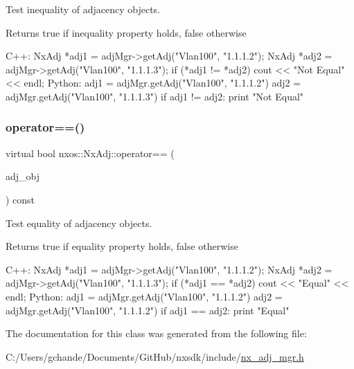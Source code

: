 Test inequality of adjacency objects.

\begin{DoxyReturn}{Returns}
true if inequality property holds, false otherwise
\end{DoxyReturn}

\begin{DoxyCode}
C++:
    NxAdj *adj1 = adjMgr->getAdj(\textcolor{stringliteral}{"Vlan100"}, \textcolor{stringliteral}{"1.1.1.2"});
    NxAdj *adj2 = adjMgr->getAdj(\textcolor{stringliteral}{"Vlan100"}, \textcolor{stringliteral}{"1.1.1.3"});
    \textcolor{keywordflow}{if} (*adj1 != *adj2)
        cout << \textcolor{stringliteral}{"Not Equal"} << endl;
Python:
    adj1 = adjMgr.getAdj(\textcolor{stringliteral}{"Vlan100"}, \textcolor{stringliteral}{"1.1.1.2"})
    adj2 = adjMgr.getAdj(\textcolor{stringliteral}{"Vlan100"}, \textcolor{stringliteral}{"1.1.1.3"})
    \textcolor{keywordflow}{if} adj1 != adj2:
         print \textcolor{stringliteral}{"Not Equal"}
\end{DoxyCode}
 \mbox{\label{classnxos_1_1_nx_adj_a19eea20ba216dd722d783bbb0982814e}} 
\subsubsection{\texorpdfstring{operator==()}{operator==()}}
{\footnotesize\ttfamily virtual bool nxos\+::\+Nx\+Adj\+::operator== (\begin{DoxyParamCaption}\item[{\mbox{\hyperlink{classnxos_1_1_nx_adj}{Nx\+Adj}} const \&}]{adj\+\_\+obj }\end{DoxyParamCaption}) const\hspace{0.3cm}{\ttfamily [pure virtual]}}

Test equality of adjacency objects.

\begin{DoxyReturn}{Returns}
true if equality property holds, false otherwise
\end{DoxyReturn}

\begin{DoxyCode}
C++:
    NxAdj *adj1 = adjMgr->getAdj(\textcolor{stringliteral}{"Vlan100"}, \textcolor{stringliteral}{"1.1.1.2"});
    NxAdj *adj2 = adjMgr->getAdj(\textcolor{stringliteral}{"Vlan100"}, \textcolor{stringliteral}{"1.1.1.3"});
    \textcolor{keywordflow}{if} (*adj1 == *adj2)
        cout << \textcolor{stringliteral}{"Equal"} << endl;
Python:
    adj1 = adjMgr.getAdj(\textcolor{stringliteral}{"Vlan100"}, \textcolor{stringliteral}{"1.1.1.2"})
    adj2 = adjMgr.getAdj(\textcolor{stringliteral}{"Vlan100"}, \textcolor{stringliteral}{"1.1.1.2"})
    \textcolor{keywordflow}{if} adj1 == adj2:
         print \textcolor{stringliteral}{"Equal"}
\end{DoxyCode}
 

The documentation for this class was generated from the following file\+:\begin{DoxyCompactItemize}
\item 
C\+:/\+Users/gchande/\+Documents/\+Git\+Hub/nxsdk/include/\mbox{\hyperlink{nx__adj__mgr_8h}{nx\+\_\+adj\+\_\+mgr.\+h}}\end{DoxyCompactItemize}
